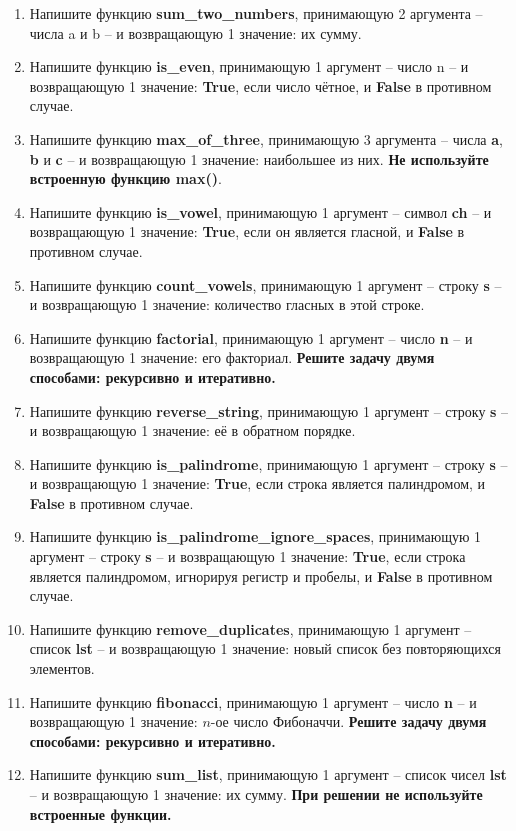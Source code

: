 \documentclass[a4,12pt]{article}
\theoremstyle{remark}
\begin{document}
\begin{enumerate}
    \item Напишите функцию \textbf{sum\_two\_numbers}, принимающую 2 аргумента – числа a и b – и возвращающую 1 значение: их сумму.
    \item Напишите функцию \textbf{is\_even}, принимающую 1 аргумент – число n – и возвращающую 1 значение: \textbf{True}, если число чётное, и \textbf{False} в противном случае.
    \item Напишите функцию \textbf{max\_of\_three}, принимающую 3 аргумента – числа \textbf{a}, \textbf{b} и \textbf{c} – и возвращающую 1 значение: наибольшее из них. \textbf{Не используйте встроенную функцию max()}.
    \item Напишите функцию \textbf{is\_vowel}, принимающую 1 аргумент – символ \textbf{ch} – и возвращающую 1 значение: \textbf{True}, если он является гласной, и \textbf{False} в противном случае.
    \item Напишите функцию \textbf{count\_vowels}, принимающую 1 аргумент – строку \textbf{s} – и возвращающую 1 значение: количество гласных в этой строке.
    \item Напишите функцию \textbf{factorial}, принимающую 1 аргумент – число \textbf{n} – и возвращающую 1 значение: его факториал. \textbf{Решите задачу двумя способами: рекурсивно и итеративно.}
    \item Напишите функцию \textbf{reverse\_string}, принимающую 1 аргумент – строку \textbf{s} – и возвращающую 1 значение: её в обратном порядке.
    \item Напишите функцию \textbf{is\_palindrome}, принимающую 1 аргумент – строку \textbf{s} – и возвращающую 1 значение: \textbf{True}, если строка является палиндромом, и \textbf{False} в противном случае.
    \item Напишите функцию \textbf{is\_palindrome\_ignore\_spaces}, принимающую 1 аргумент – строку \textbf{s} – и возвращающую 1 значение: \textbf{True}, если строка является палиндромом, игнорируя регистр и пробелы, и \textbf{False} в противном случае.
    \item Напишите функцию \textbf{remove\_duplicates}, принимающую 1 аргумент – список \textbf{lst} – и возвращающую 1 значение: новый список без повторяющихся элементов.
    \item Напишите функцию \textbf{fibonacci}, принимающую 1 аргумент – число \textbf{n} – и возвращающую 1 значение: $n$-ое число Фибоначчи. \textbf{Решите задачу двумя способами: рекурсивно и итеративно.}
    \item Напишите функцию \textbf{sum\_list}, принимающую 1 аргумент – список чисел \textbf{lst} – и возвращающую 1 значение: их сумму. \textbf{При решении не используйте встроенные функции.}

\end{enumerate}
\end{document}
